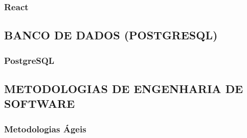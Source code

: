         \subsubsection*{React}

    \subsection{BANCO DE DADOS (POSTGRESQL)}

        \subsubsection*{PostgreSQL}

    \subsection{METODOLOGIAS DE ENGENHARIA DE SOFTWARE}

        \subsubsection*{Metodologias Ágeis}
        